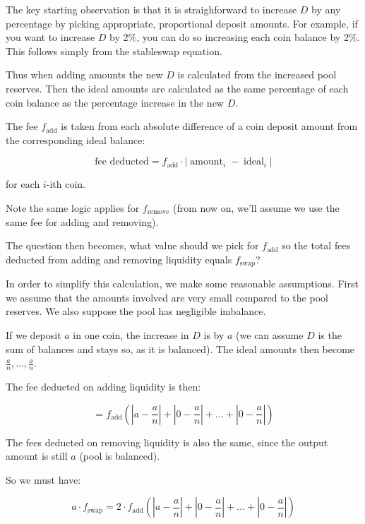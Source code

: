 \documentclass[
]{article}
\begin{document}
The key starting observation is that it is straighforward to increase
\(D\) by any percentage by picking appropriate, proportional deposit
amounts. For example, if you want to increase \(D\) by 2\%, you can do
so increasing each coin balance by 2\%. This follows simply from the
stableswap equation.

Thus when adding amounts the new \(D\) is calculated from the increased
pool reserves. Then the ideal amounts are calculated as the same
percentage of each coin balance as the percentage increase in the new
\(D\).

The fee \(f_{\operatorname{add}}\) is taken from each absolute
difference of a coin deposit amount from the corresponding ideal
balance:

\[ \text{fee deducted} = f_{\operatorname{add}} \cdot |\operatorname{amount}_i - \operatorname{ideal}_i| \]

for each \(i\)-ith coin.

Note the same logic applies for \(f_{\operatorname{remove}}\) (from now
on, we'll assume we use the same fee for adding and removing).

The question then becomes, what value should we pick for
\(f_{\operatorname{add}}\) so the total fees deducted from adding and
removing liquidity equals \(f_{\operatorname{swap}}\)?

In order to simplify this calculation, we make some reasonable
assumptions. First we assume that the amounts involved are very small
compared to the pool reserves. We also suppose the pool has negligible
imbalance.

If we deposit \(a\) in one coin, the increase in \(D\) is by \(a\) (we
can assume \(D\) is the sum of balances and stays so, as it is
balanced). The ideal amounts then become
\(\frac{a}{n}, \dots, \frac{a}{n}\).

The fee deducted on adding liquidity is then:

\[ = f_{\operatorname{add}}\left( \left|a - \frac{a}{n}\right| + \left|0 - \frac{a}{n}\right| + ... + \left|0 - \frac{a}{n}\right| \right) \]

The fees deducted on removing liquidity is also the same, since the
output amount is still \(a\) (pool is balanced).

So we must have:

\[ a \cdot f_{\operatorname{swap}} = 2 \cdot f_{\operatorname{add}} \left( \left|a - \frac{a}{n}\right| + \left|0 - \frac{a}{n}\right| + ... + \left|0 - \frac{a}{n}\right| \right)\]
\end{document}
